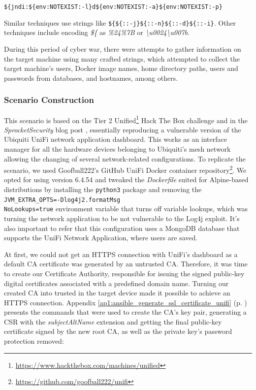 \texttt{\$\{jndi:\$\{env:NOTEXIST:-l\}d\$\{env:NOTEXIST:-a\}\$\{env:NOTEXIST:-p\}}


Similar techniques use strings like \texttt{\$\{\$\{::-j\}\$\{::-n\}\$\{::-d\}\$\{::-i\}}. Other techniques include encoding \textit{\$\{} as \textit{\%24\%7B} or \textit{\textbackslash u0024\textbackslash u007b}.

During this period of cyber war, there were attempts to gather information on the target machine using many crafted strings, which attempted to collect the target machine's users, Docker image names, home directory paths, users and passwords from databases, and hostnames, among others.

\subsubsection{Scenario Construction} \label{sec:validation_log4j_scenario_construction}

This scenario is based on the Tier 2 Unified\footnote{\url{https://www.hackthebox.com/machines/unified}} Hack The Box challenge and in the \textit{SprocketSecurity} blog post \cite{sprocketsecurity_ref}, essentially reproducing a vulnerable version of the Ubiquiti UniFi network application dashboard. This works as an interface manager for all the hardware devices belonging to Ubiquiti's mesh network allowing the changing of several network-related configurations. To replicate the scenario, we used Goofball222's GitHub UniFi Docker container repository\footnote{\url{https://github.com/goofball222/unifi}}. We opted for using version 6.4.54 and tweaked the \textit{Dockerfile} suited for Alpine-based distributions by installing the \texttt{python3} package
and removing the \texttt{JVM\_EXTRA\_OPTS=-Dlog4j2.formatMsg\\NoLookups=true} environment variable that turns off variable lookups, which was turning the network application to be not vulnerable to the Log4j exploit. It's also important to refer that this configuration uses a MongoDB database that supports the UniFi Network Application, where users are saved.

At first, we could not get an HTTPS connection with UniFi's dashboard as a default CA certificate was generated by an untrusted CA. Therefore, it was time to create our Certificate Authority, responsible for issuing the signed public-key digital certificates associated with a predefined domain name. Turning our created CA into trusted in the target device made it possible to achieve an HTTPS connection. Appendix \ref{ap1:ansible_generate_ssl_certificate_unifi} (p. \pageref{ap1:ansible_generate_ssl_certificate_unifi}) presents the commands that were used to create the CA's key pair, generating a CSR with the \textit{subjectAltName} extension and getting the final public-key certificate signed by the new root CA, as well as the private key's password protection removed:

